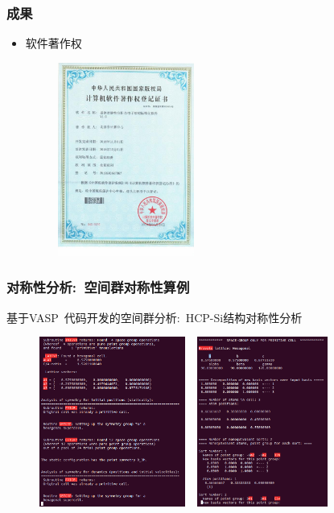 \documentclass[cjk,slidestop,handout,compress,mathserif,blue]{beamer}	%
\begin{document}
\frame
{
	\frametitle{成果}
	\begin{itemize}
		\item 软件著作权\\
			\vskip 5pt
			\fontsize{7.5pt}{4.2pt}
\begin{figure}[h!]
	\vspace*{-0.1in}
\centering
\includegraphics[height=2.5in]{Figures/Certificate-2.jpg}
\label{Certificates}
\end{figure}
	\end{itemize}
}

\frame
{
	\frametitle{对称性分析:~空间群对称性算例}
	基于\textrm{VASP~}代码开发的空间群分析:~\textrm{HCP-Si}结构对称性分析
\begin{figure}[h!]
\centering
\includegraphics[height=2.2in,width=1.9in,viewport=0 0 520 570,clip]{Figures/HCP_Si_Symm-1.png}
\hspace*{0.01in}
\includegraphics[height=2.2in,width=1.9in,viewport=0 0 520 580,clip]{Figures/HCP_Si_Symm-2.png}
\caption{\fontsize{7.2pt}{4.2pt}}
\label{Symmetry_Analysis}
\end{figure} 
}
\end{document}
